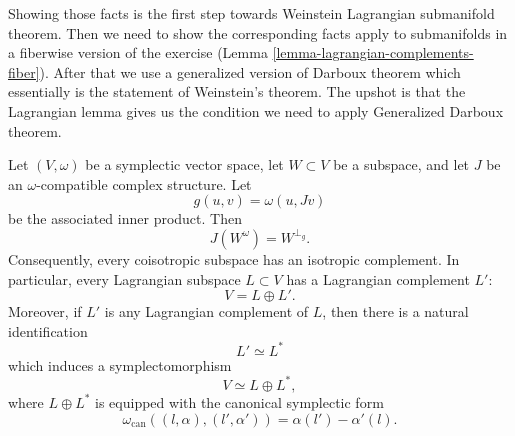 Showing those facts is the first step
towards Weinstein Lagrangian
submanifold theorem.
Then we need to show the corresponding
facts apply to submanifolds in a
fiberwise version of the exercise
(Lemma 
\ref{lemma-lagrangian-complements-fiber}).
After that we use a generalized
version of Darboux theorem which essentially
is the statement of Weinstein's theorem.
The upshot is that the Lagrangian lemma
gives us the condition we need
to apply Generalized Darboux theorem.

\begin{exercise}
\label{exercise-lagrangian-complements}
Let $(V,\omega)$ be a symplectic vector
space, let $W\subset V$ be a subspace, and
let $J$ be an $\omega$-compatible complex
structure. Let
$$
g(u,v)=\omega(u,Jv)
$$
be the associated inner product. Then
$$
J(W^\omega)=W^{\perp_g}.
$$
Consequently, every coisotropic subspace
has an isotropic complement. In particular,
every Lagrangian subspace $L\subset V$ has
a Lagrangian complement $L'$:
$$
V=L\oplus L'.
$$
Moreover, if $L'$ is any Lagrangian
complement of $L$, then there is a natural
identification
$$
L'\simeq L^*
$$
which induces a symplectomorphism
$$
V\simeq L\oplus L^*,
$$
where $L\oplus L^*$ is equipped with the
canonical symplectic form
$$
\omega_{\operatorname{can}}
((l,\alpha),(l',\alpha'))
=
\alpha(l')-\alpha'(l).
$$
\end{exercise}

